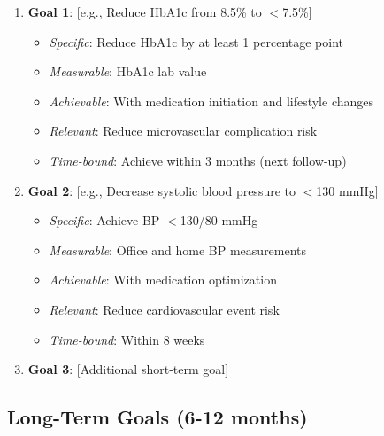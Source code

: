 \documentclass[11pt,letterpaper]{article}
\begin{document}
\begin{enumerate}[leftmargin=*]
    \item \textbf{Goal 1}: [e.g., Reduce HbA1c from 8.5\% to $<$7.5\%]
    \begin{itemize}
        \item \textit{Specific}: Reduce HbA1c by at least 1 percentage point
        \item \textit{Measurable}: HbA1c lab value
        \item \textit{Achievable}: With medication initiation and lifestyle changes
        \item \textit{Relevant}: Reduce microvascular complication risk
        \item \textit{Time-bound}: Achieve within 3 months (next follow-up)
    \end{itemize}
    
    \item \textbf{Goal 2}: [e.g., Decrease systolic blood pressure to $<$130 mmHg]
    \begin{itemize}
        \item \textit{Specific}: Achieve BP $<$130/80 mmHg
        \item \textit{Measurable}: Office and home BP measurements
        \item \textit{Achievable}: With medication optimization
        \item \textit{Relevant}: Reduce cardiovascular event risk
        \item \textit{Time-bound}: Within 8 weeks
    \end{itemize}
    
    \item \textbf{Goal 3}: [Additional short-term goal]
\end{enumerate}

\subsection*{Long-Term Goals (6-12 months)}
\end{document}
